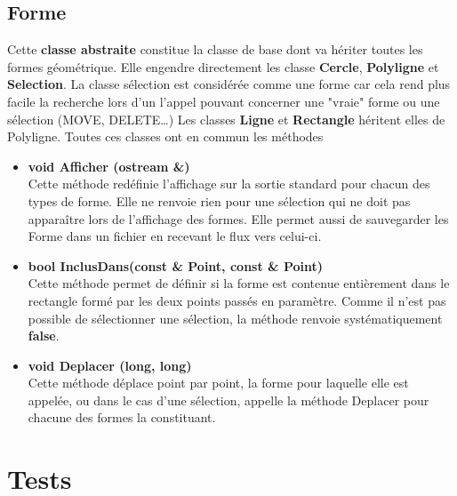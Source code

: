 \documentclass[12pt]{article}
\begin{document}
\subsection{Forme}
Cette \textbf{classe abstraite} constitue la classe de base dont va hériter toutes les formes géométrique. Elle engendre directement les classe \textbf{Cercle}, \textbf{Polyligne} et \textbf{Selection}. La classe sélection est considérée comme une forme car cela rend plus facile la recherche lors d'un l'appel pouvant concerner une "vraie" forme ou une sélection (MOVE, DELETE\ldots)  Les classes \textbf{Ligne} et \textbf{Rectangle} héritent elles de Polyligne. Toutes ces classes ont en commun les méthodes
\begin{itemize}
\item\textbf{void Afficher (ostream \&)}\\
Cette méthode redéfinie l'affichage sur la sortie standard pour chacun des types de forme. Elle ne renvoie rien pour une sélection qui ne doit pas apparaître lors de l'affichage des formes. Elle permet aussi de sauvegarder les Forme dans un fichier en recevant le flux vers celui-ci.
\item \textbf{bool InclusDans(const \& Point, const \& Point)}\\
 Cette méthode permet de définir si la forme est contenue entièrement dans le rectangle formé par les deux points passés en paramètre. Comme il n'est pas possible de sélectionner une sélection, la méthode renvoie systématiquement \textbf{false}.
\item\textbf{void Deplacer (long, long)}\\
Cette méthode déplace point par point, la forme pour laquelle elle est appelée, ou dans le cas d'une sélection, appelle la méthode Deplacer pour chacune des formes la constituant.
\end{itemize}

\section{Tests}
\end{document}
